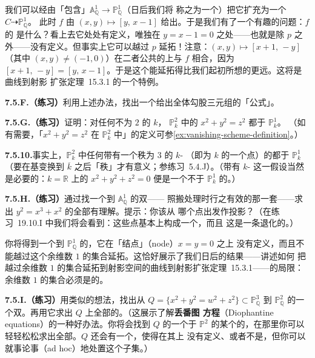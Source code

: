 我们可以经由「包含」$\mathbb{A}^1_{\mathbb{Q}}\to\mathbb{P}^1_{\mathbb{Q}}$（日后我们将%
称之为一个\trOpenEmbedding）把它扩充为一个\trRationalMap{} $C\dashrightarrow\mathbb{P}^1_{\mathbb{Q}}$。%
此时 $f$ 由 $(x,y)\mapsto[y,\,x-1]$ 给出。于是我们有了一个有趣的问题：$f$ 的%
\trDomainOfDefinition{}是什么？看上去它处处有定义，唯独在 $y=x-1=0$ 之处——也就是除 $p$ %
之外——没有定义。但事实上它可以越过 $p$ 延拓！注意：$(x,y)\mapsto[x+1,\,-y]$（其中%
$(x,y)\neq(-1,0)$）在二者公共的\trDomainOfDefinition{}上与 $f$ 相合，因为%
$[x+1,\,-y]=[y,\,x-1]$。于是这个\trRationalMap{}能延拓得比我们起初所想的更远。这将是曲线到射影%
扩张定理~15.3.1 的一个特例。

\textbf{7.5.F.（练习）}\quad 利用上述办法，找出一个给出全体勾股三元组的「公式」。

\textbf{7.5.G.（练习）}\quad 证明：对任何\trCharacteristic{}不为 $2$ 的\trField{} $k$，%
$\mathbb{P}^2_k$ 中的\trConic{} $x^2+y^2=z^2$ 都\trIsomorphic{}于 $\mathbb{P}^1_k$。%
（如有需要，「$x^2+y^2=z^2$ 在 $\mathbb{P}^2_k$ 中」的定义可参\cref{ex:vanishing-scheme-definition}。）

\textbf{7.5.10.}\quad 事实上，$\mathbb{P}^2_k$ 中任何带有一个秩为 $3$ 的 $k$-\trValuedPoint{}%
（即\trResidueField{}为 $k$ 的一个点）的\trConic{}都\trIsomorphic{}于 $\mathbb{P}^1_k$ %
（要在基变换到 $\overline{k}$ 之后「秩」才有意义；参练习~5.4.J）。（带有 $k$-\trValuedPoint{}%
这一假设当然是必要的：$k=\mathbb{R}$ 上的 $x^2+y^2+z^2=0$ 便是一个不\trIsomorphic{}于%
$\mathbb{P}^1_k$ 的\trConic。）

\textbf{7.5.H.（练习）}\quad 通过找一个到 $\mathbb{A}^1_{\mathbb{Q}}$ 的双\trRationalMap{}——%
照搬处理\trConic{}时行之有效的那一套——求出 $y^2=x^3+x^2$ 的全部有理解。提示：你该从%
哪个点出发作投影？（在练习~19.10.I 中我们将会看到：这些点基本上构成一个\trGroup，而且%
这是一条退化的\trEllipticCurve。）

你将得到一个到 $\mathbb{P}^1_{\mathbb{Q}}$ 的\trRationalMap{}，它在「结点」（node）$x=y=0$ 之上%
没有定义，而且不能越过这个余维数 $1$ 的集合延拓。这恰好展示了我们日后的结果——讲述如何%
把\trRationalMap{}越过余维数 $1$ 的集合延拓到射影空间的曲线到射影扩张定理~15.3.1——的局限：%
余维数 $1$ 的集合必须是\trRegular{}的。

\textbf{7.5.I.（练习）}\quad 用类似的想法，找出从\trQuadricSurface{}%
$Q=\{x^2+y^2=w^2+z^2\}\subset\mathbb{P}^3_{\mathbb{Q}}$ 到 $\mathbb{P}^2_{\mathbb{Q}}$ %
的一个双\trRationalMap{}。再用它求出 $Q$ 上全部的\trRationalPoint。（这展示了解\textbf{丢番图%
方程}（Diophantine equations）的一种好办法。你将会找到 $Q$ 的一个\trIsomorphic{}于%
$\mathbb{P}^2$ 的某个\trDense\trOpenSubset{}的\trDense\trOpenSubset，在那里你可以%
轻轻松松求出全部\trRationalPoint。$Q$ 还会有一个\trClosedSubset，使得\trRationalMap{}在其上%
没有定义、或者不是\trIsomorphism，但你可以就事论事（ad hoc）地处置这个子集。）

